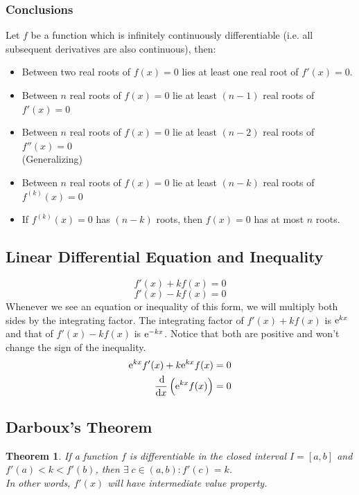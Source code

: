 \documentclass[14]{article}
\newtheorem{theorem}{Theorem}
\theoremstyle{definition}
\theoremstyle{case}
\begin{document}
\subsubsection{Conclusions}
Let $f$ be a function which is infinitely continuously differentiable (i.e. all subsequent derivatives are also continuous), then:
\begin{itemize}
\item Between two real roots of $f(x) = 0$ lies at least one real root of $f'(x) = 0$.
\item Between $n$ real roots of $f(x) = 0$ lie at least $(n - 1)$ real roots of $f'(x) = 0$
\item Between $n$ real roots of $f(x) = 0$ lie at least $(n - 2)$ real roots of $f''(x) = 0$\\
(Generalizing)
\item Between $n$ real roots of $f(x) = 0$ lie at least $(n - k)$ real roots of $f^{(k)}(x) = 0$
\item If $f^{(k)}(x) = 0$ has $(n - k)$ roots, then $f(x) = 0$ has at most $n$ roots.
\end{itemize}
\subsection{Linear Differential Equation and Inequality}
\[f'(x) + k f(x) = 0\]
\[f'(x) - k f(x) = 0\]
Whenever we see an equation or inequality of this form, we will multiply both sides by the integrating factor. The integrating factor of $f'(x) + k f(x)$ is ${\rm e}^{kx}$ and that of $f'(x) - k f(x)$ is ${\rm e}^{-kx}$. Notice that both are positive and won't change the sign of the inequality.
\begin{align*}
{\rm e}^{kx}f'(x) + k {\rm e}^{kx} f(x) = 0\\
\dfrac{\dif}{\dif x}\left({\rm e}^{kx} f(x)\right) = 0
\end{align*}
\pagebreak
\subsection{Darboux's Theorem}
\begin{theorem}
If a function $f$ is differentiable in the closed interval $I = [a, b]$ and $f'(a) < k < f'(b)$, then $\exists \; c \in (a, b) : f'(c) = k$.\\
In other words, $f'(x)$ will have intermediate value property.
\end{theorem}
\end{document}
